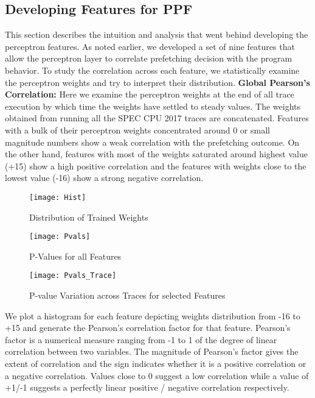 \subsection{Developing Features for PPF}
\label{Method-Features}
This section describes the intuition and analysis that went behind
developing the perceptron features.  As noted earlier, we developed a
set of nine features that allow the perceptron layer to correlate
prefetching decision with the program behavior.  To study the
correlation across each feature, we statistically examine the
perceptron weights and try to interpret their distribution.
\newline
\newline
\noindent \textbf{Global Pearson's Correlation:} Here we examine the
perceptron weights at the end of all trace execution by which time the
weights have settled to steady values. The weights obtained from
running all the SPEC CPU 2017 traces are concatenated.  Features with
a bulk of their perceptron weights concentrated around 0 or small
magnitude numbers show a weak correlation with the prefetching
outcome.  On the other hand, features with most of the weights
saturated around highest value (+15) show a high positive correlation
and the features with weights close to the lowest value (-16) show a
strong negative correlation.

\begin{figure}[h]
  \begin{center}
    \texttt{[image: Hist]}
    \caption{Distribution of Trained Weights}
    \label{Fig:Hist}
  \end{center}
\end{figure}

\begin{figure}[h]
  \begin{center}
    \texttt{[image: Pvals]}
    \caption{P-Values for all Features}
    \label{Fig:Pvals}
  \end{center}
\end{figure}


\begin{figure}[h]
  \begin{center}
    \texttt{[image: Pvals\_Trace]}
    \caption{P-value Variation across Traces for selected Features}
    \label{Fig:Pvals_Trace}
  \end{center}
\end{figure}

We plot a histogram for each feature depicting weights distribution
from -16 to +15 and generate the Pearson's correlation factor for that
feature.  Pearson's factor is a numerical measure ranging from -1 to 1
of the degree of linear correlation between two variables. The
magnitude of Pearson's factor gives the extent of correlation and the
sign indicates whether it is a positive correlation or a negative
correlation. Values close to 0 suggest a low correlation while a value
of +1/-1 suggests a perfectly linear positive / negative correlation
respectively.

